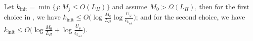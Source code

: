 \begin{proposition}
    \label{prop:main/initial-phase-decreasing-Mk}
    Let $k_{\mathrm{init}} = \min\{ j : M_j \leq O(L_H) \}$ and assume $M_0 > \Omega(L_H)$, then 
    for the first choice in , we have
        $k_{\mathrm{init}} 
        \leq 
        O\Big ( \log \frac{M_0}{L_H} \log \frac{U_\varphi}{\epsilon_{k_{\mathrm{init}}}}\Big)$;
    and for the second choice, we have
        $k_{\mathrm{init}} 
        \leq 
        O\Big ( \log \frac{M_0}{L_H} + \log \frac{U_\varphi}{\epsilon_{k_{\mathrm{init}}}}\Big)$.
\end{proposition}


